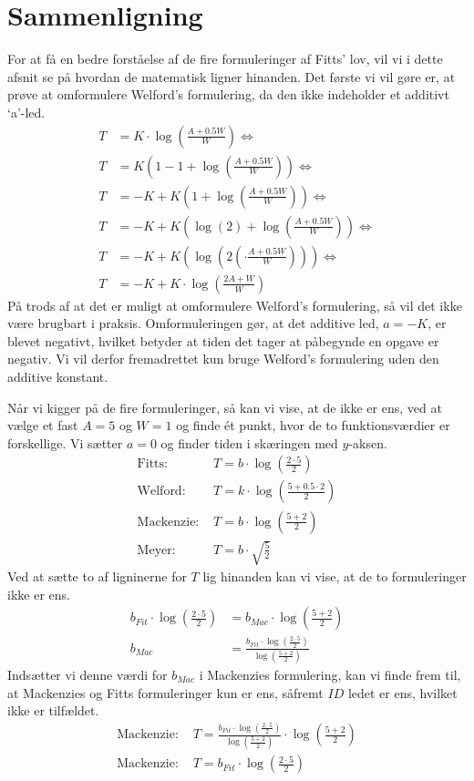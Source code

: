 \section*{Sammenligning}
For at få en bedre forståelse af de fire formuleringer af Fitts' lov, vil vi i dette afsnit se på hvordan de matematisk ligner hinanden. Det første vi vil gøre er, at prøve at omformulere Welford's formulering, da den ikke indeholder et additivt `a'-led. 
\begin{align*}
T &= K\cdot\log\left(\frac{A+0.5W}{W}\right)\Leftrightarrow\\
T &= K\left(1-1+\log\left(\frac{A+0.5W}{W}\right)\right)\Leftrightarrow\\
T &= -K+K\left(1+\log\left(\frac{A+0.5W}{W}\right)\right)\Leftrightarrow\\
T &= -K+K\left(\log(2)+\log\left(\frac{A+0.5W}{W}\right)\right)\Leftrightarrow\\
T &= -K+K\left(\log\left(2\left(\cdot\frac{A+0.5W}{W}\right)\right)\right)\Leftrightarrow\\
T &= -K+K\cdot\log\left(\frac{2A+W}{W}\right)
\end{align*}
På trods af at det er muligt at omformulere Welford's formulering, så vil det ikke være brugbart i praksis. Omformuleringen gør, at det additive led, $a = -K$, er blevet negativt, hvilket betyder at tiden det tager at påbegynde en opgave er negativ. Vi vil derfor fremadrettet kun bruge Welford's formulering uden den additive konstant.

Når vi kigger på de fire formuleringer, så kan vi vise, at de ikke er ens, ved at vælge et fast $A = 5$ og $W = 1$ og finde ét punkt, hvor de to funktionsværdier er forskellige. Vi sætter $a=0$ og finder tiden i skæringen med $y$-aksen.
\begin{align*}
\text{Fitts: } &T=b\cdot\log\left(\frac{2\cdot5}{2}\right)\\
\text{Welford: } &T=k\cdot\log\left(\frac{5+0.5\cdot 2}{2}\right)\\
\text{Mackenzie: } &T=b\cdot\log\left(\frac{5 + 2}{2}\right)\\
\text{Meyer: } &T=b\cdot\sqrt{\frac{5}{2}}
\end{align*}
Ved at sætte to af ligninerne for $T$ lig hinanden kan vi vise, at de to formuleringer ikke er ens.
\begin{align*}
b_{Fit}\cdot\log\left(\frac{2\cdot5}{2}\right)&=b_{Mac}\cdot\log\left(\frac{5 + 2}{2}\right)\\
b_{Mac} &= \frac{b_{Fit}\cdot\log\left(\frac{2\cdot5}{2}\right)}{\log\left(\frac{5 + 2}{2}\right)}
\end{align*}
Indsætter vi denne værdi for $b_{Mac}$ i Mackenzies formulering, kan vi finde frem til, at Mackenzies og Fitts formuleringer kun er ens, såfremt $ID$ ledet er ens, hvilket ikke er tilfældet.
\begin{align*}
\text{Mackenzie: } &T =\frac{b_{Fit}\cdot\log\left(\frac{2\cdot5}{2}\right)}{\log\left(\frac{5 + 2}{2}\right)}\cdot\log\left(\frac{5 + 2}{2}\right)\\
\text{Mackenzie: } &T =b_{Fit}\cdot\log\left(\frac{2\cdot5}{2}\right)
\end{align*}

